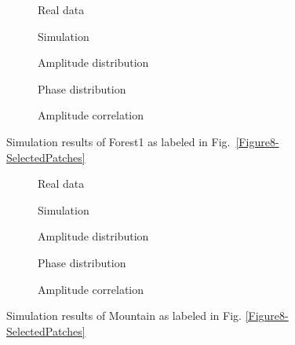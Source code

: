 \documentclass[journal]{IEEEtran}
\begin{document}
\begin{figure}[hbt]
\centering
\begin{subfigure}[t]{4 cm}
	\centering
	\caption{Real data}\label{Figure11(a)}
\end{subfigure}
\quad
\begin{subfigure}[t]{4 cm}
	\centering
	\caption{Simulation}\label{Figure11(b)}
\end{subfigure}
\quad
\begin{subfigure}[t]{4 cm}
	\centering
	\caption{Amplitude distribution}\label{Figure11(c)}
\end{subfigure}
\quad
\begin{subfigure}[t]{4 cm}
	\centering
	\caption{Phase distribution}\label{Figure11(d)}
\end{subfigure}
\quad
\begin{subfigure}[t]{8 cm}
	\centering
	\caption{Amplitude correlation}\label{Figure11(e)}
\end{subfigure}
\caption{Simulation results of Forest1 as labeled in Fig.~\ref{Figure8-SelectedPatches}}\label{Figure11}
\end{figure}

\begin{figure}[hbt]
\centering
\begin{subfigure}[t]{4 cm}
	\centering
	\caption{Real data}\label{Figure12(a)}
\end{subfigure}
\quad
\begin{subfigure}[t]{4 cm}
	\centering
	\caption{Simulation}\label{Figure12(b)}
\end{subfigure}
\quad
\begin{subfigure}[t]{4 cm}
	\centering
	\caption{Amplitude distribution}\label{Figure12(c)}
\end{subfigure}
\quad
\begin{subfigure}[t]{4 cm}
	\centering
	\caption{Phase distribution}\label{Figure12(d)}
\end{subfigure}
\quad
\begin{subfigure}[t]{8 cm}
	\centering
	\caption{Amplitude correlation}\label{Figure12(e)}
\end{subfigure}
\caption{Simulation results of Mountain as labeled in Fig. \ref{Figure8-SelectedPatches}}\label{Figure12}
\end{figure}
\end{document}
